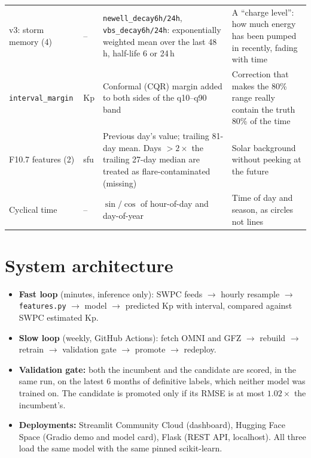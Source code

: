 \documentclass[11pt,a4paper]{article}
\newcommand{\code}[1]{\texttt{#1}}
\begin{document}
\begin{longtable}{p{2.4cm}p{1.4cm}p{5.6cm}p{5.6cm}}
v3: storm memory (4) & -- & \code{newell\_decay6h/24h}, \code{vbs\_decay6h/24h}: exponentially weighted mean over the last 48\,h, half-life 6 or 24\,h & A ``charge level'': how much energy has been pumped in recently, fading with time\\
\code{interval\_margin} & Kp & Conformal (CQR) margin added to both sides of the q10--q90 band & Correction that makes the 80\% range really contain the truth 80\% of the time\\
F10.7 features (2) & sfu & Previous day's value; trailing 81-day mean. Days $>2\times$ the trailing 27-day median are treated as flare-contaminated (missing) & Solar background without peeking at the future\\
Cyclical time & -- & $\sin/\cos$ of hour-of-day and day-of-year & Time of day and season, as circles not lines\\\bottomrule
\end{longtable}

\section{System architecture}
\begin{itemize}
\item \textbf{Fast loop} (minutes, inference only): SWPC feeds $\rightarrow$ hourly resample $\rightarrow$
\code{features.py} $\rightarrow$ model $\rightarrow$ predicted Kp with interval, compared against SWPC estimated Kp.
\item \textbf{Slow loop} (weekly, GitHub Actions): fetch OMNI and GFZ $\rightarrow$ rebuild $\rightarrow$ retrain
$\rightarrow$ validation gate $\rightarrow$ promote $\rightarrow$ redeploy.
\item \textbf{Validation gate:} both the incumbent and the candidate are scored, in the same run, on the latest
6 months of definitive labels, which neither model was trained on. The candidate is promoted only if its RMSE
is at most $1.02\times$ the incumbent's.
\item \textbf{Deployments:} Streamlit Community Cloud (dashboard), Hugging Face Space (Gradio demo and model card),
Flask (REST API, localhost). All three load the same model with the same pinned scikit-learn.
\end{itemize}

\end{document}
